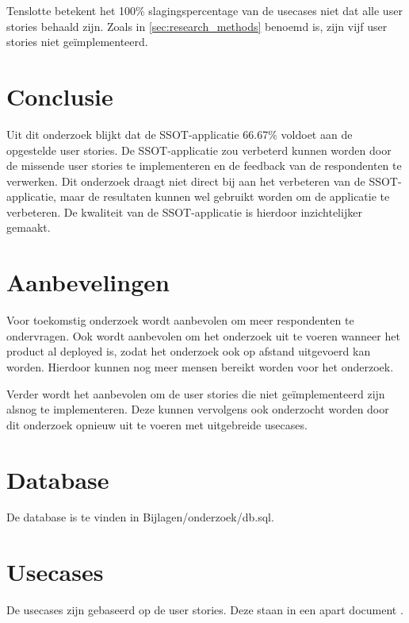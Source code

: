 \documentclass[a4paper, dutch]{article}
\begin{document}
Tenslotte betekent het 100\% slagingspercentage van de usecases niet dat alle user stories behaald zijn. Zoals in \autoref{sec:research_methods} benoemd is, zijn vijf user stories niet geïmplementeerd.

\section{Conclusie}

Uit dit onderzoek blijkt dat de SSOT-applicatie 66.67\% voldoet aan de opgestelde user stories. De SSOT-applicatie zou verbeterd kunnen worden door de missende user stories te implementeren en de feedback van de respondenten te verwerken. Dit onderzoek draagt niet direct bij aan het verbeteren van de SSOT-applicatie, maar de resultaten kunnen wel gebruikt worden om de applicatie te verbeteren. De kwaliteit van de SSOT-applicatie is hierdoor inzichtelijker gemaakt.

\section{Aanbevelingen}

Voor toekomstig onderzoek wordt aanbevolen om meer respondenten te ondervragen. Ook wordt aanbevolen om het onderzoek uit te voeren wanneer het product al deployed is, zodat het onderzoek ook op afstand uitgevoerd kan worden. Hierdoor kunnen nog meer mensen bereikt worden voor het onderzoek.

Verder wordt het aanbevolen om de user stories die niet geïmplementeerd zijn alsnog te implementeren. Deze kunnen vervolgens ook onderzocht worden door dit onderzoek opnieuw uit te voeren met uitgebreide usecases.

\nocite{good_research_guide}
\nocite{handreiking_aanpak_en_onderzoek}
\printbibliography

\appendix

\section{Database}
\label{app:database}

De database is te vinden in Bijlagen/onderzoek/db.sql.

\section{Usecases}
\label{app:usecases}
De usecases zijn gebaseerd op de user stories. Deze staan in een apart document \parencite{user_stories}.
\end{document}
